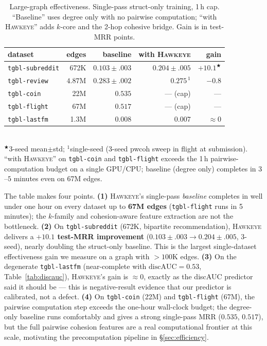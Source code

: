\documentclass[sigconf,nonacm,review]{acmart}
\newcommand{\method}{\textsc{Hawkeye}\xspace}
\begin{document}
\begin{table}[t]
\caption{Large-graph effectiveness. Single-pass struct-only training,
1\,h cap. ``Baseline'' uses degree only with no pairwise computation;
``with \method'' adds $k$-core and the 2-hop cohesive bridge. Gain is in
test-MRR points.}
\label{tab:scalability}
\centering\small
\setlength{\tabcolsep}{4pt}
\begin{tabular}{lrrrr}
\toprule
dataset & edges & baseline & with \method & gain \\
\midrule
\texttt{tgbl-subreddit} & 672K   & $0.103\!\pm\!.003$ & $\mathbf{0.204\!\pm\!.005}$ & $\mathbf{+10.1}^\bigstar$ \\
\texttt{tgbl-review}    & $4.87$M & $0.283\!\pm\!.002$ & $0.275^{\,1}$        & $-0.8$ \\
\texttt{tgbl-coin}      & 22M    & $0.535$            & --- (cap)               & --- \\
\texttt{tgbl-flight}    & 67M    & $0.517$            & --- (cap)               & --- \\
\texttt{tgbl-lastfm}    & 1.3M   & $0.008$            & $0.007$                 & $\approx 0$ \\
\bottomrule
\end{tabular}
\\[2pt]
{\footnotesize $^{\bigstar}$3-seed mean$\pm$std; $^{1}$single-seed (3-seed
pwcoh sweep in flight at submission).}
\\[2pt]
{\footnotesize ``with \method'' on \texttt{tgbl-coin} and
\texttt{tgbl-flight} exceeds the 1\,h pairwise-computation budget on a
single GPU/CPU; baseline (degree only) completes in $3$--$5$ minutes
even on 67M edges.}
\end{table}

The table makes four points. \textbf{(1)} \method's single-pass
\emph{baseline} completes in well under one hour on every dataset up to
\textbf{67M edges} (\texttt{tgbl-flight} runs in 5\,minutes); the
$k$-family and cohesion-aware feature extraction are not the
bottleneck. \textbf{(2)} On \texttt{tgbl-subreddit} (672K, bipartite
recommendation), \method delivers a \textbf{$+10.1$ test-MRR
improvement} ($0.103\!\pm\!.003 \to 0.204\!\pm\!.005$, 3-seed),
nearly doubling the struct-only baseline. This is the largest
single-dataset effectiveness gain we measure on a graph with $>\!100$K
edges. \textbf{(3)} On the degenerate
\texttt{tgbl-lastfm} (near-complete with $\mathrm{discAUC}\!=\!0.53$,
Table~\ref{tab:discauc}), \method's gain is $\approx 0$, exactly as the
discAUC predictor said it should be --- this is negative-result
evidence that our predictor is calibrated, not a defect.
\textbf{(4)} On \texttt{tgbl-coin} (22M) and \texttt{tgbl-flight}
(67M), the pairwise computation step exceeds the one-hour wall-clock
budget; the degree-only baseline runs comfortably and gives a strong
single-pass MRR ($0.535$, $0.517$), but the full pairwise cohesion
features are a real computational frontier at this scale, motivating
the precomputation pipeline in \S\ref{sec:efficiency}.
\end{document}
